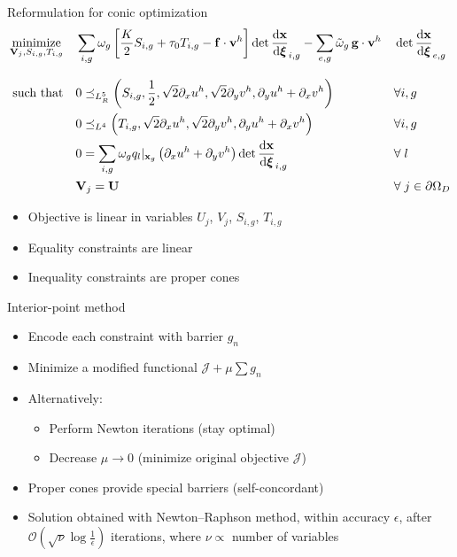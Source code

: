 \documentclass{beamer}  %
\newcommand{\xx}{\mathbf{x}}
\newcommand{\vv}{\mathbf{v}}
\DeclareMathOperator*{\minimize}{minimize}
\begin{document}
\begin{frame}{Reformulation for conic optimization}
    \small
    \begin{alignat*}{2}
        \minimize_{\mathbf{V}_j, S_{i,g}, T_{i,g}} \quad &\sum_{i,g} \omega_g \left[\frac{K}{2} S_{i,g} + \tau_0 T_{i,g} - \mathbf{f} \cdot \vv^h \right] \det \dv{\mathbf{x}}{\boldsymbol \xi}_{i,g}-\sum_{e,g} \tilde \omega_g \,\mathbf{g}\cdot \vv^h &&\det \dv{\mathbf{x}}{\boldsymbol \xi}_{e,g}\\[8pt]
        \text{such that} \quad & 0 \preceq_{L^5_R} \left(S_{i,g}, \frac{1}{2}, \sqrt{2}\partial_x u^h, \sqrt{2}\partial_y v^h, \partial_y u^h+\partial_x v^h\right) && \forall i, g\\
        & 0 \preceq_{L^4} \left(T_{i,g}, \sqrt{2}\partial_x u^h, \sqrt{2}\partial_y v^h, \partial_y u^h+\partial_x v^h\right) && \forall i, g\\
        &0 = \sum_{i,g} \omega_g q_l \vert_{\xx_g} \left(\partial_x u^h + \partial_y v^h\right) \det \dv{\mathbf{x}}{\boldsymbol \xi}_{i,g} && \forall\; l\\
        &\mathbf{V}_{j} = \mathbf{U} && \forall\; j \in \partial\Omega_D
    \end{alignat*}
    \normalsize
    \pause
    \vspace{-12pt}
    \begin{itemize}
        \item Objective is linear in variables $U_j$, $V_j$, $S_{i,g}$, $T_{i,g}$
        \item Equality constraints are linear
        \item Inequality constraints are proper cones
    \end{itemize}
\end{frame}

\begin{frame}{Interior-point method}
    \begin{itemize}
        \item Encode each constraint with barrier $g_n$
        \item Minimize a modified functional $\mathcal{J} + \mu\sum g_n$
        \item Alternatively:
        \begin{itemize}
            \item Perform Newton iterations (stay optimal)
            \item Decrease $\mu \to 0$ (minimize original objective $\mathcal{J}$)
        \end{itemize} 
        \item Proper cones provide special barriers (self-concordant)
        \item Solution obtained with Newton–Raphson method, within accuracy $\epsilon$, after $\mathcal{O}(\sqrt{\nu} \log \frac{1}{\epsilon})$ iterations, where $\nu\propto$ number of variables
    \end{itemize}
\end{frame}
\end{document}

